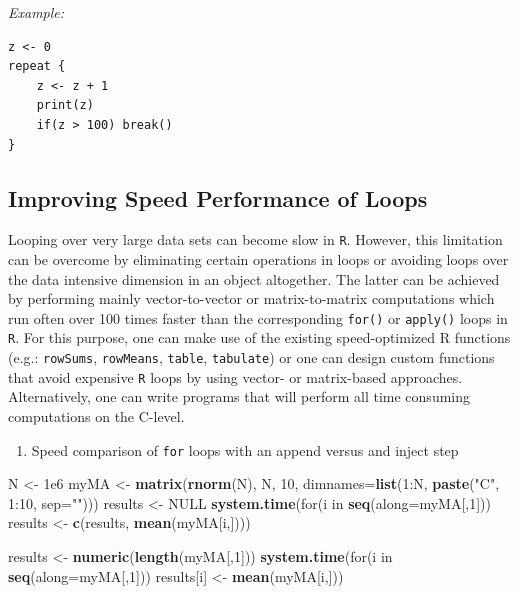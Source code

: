 \documentclass[]{article}
\def\tightlist{}
\newenvironment{Shaded}{\begin{snugshade}}{\end{snugshade}}
\newcommand{\KeywordTok}[1]{\textcolor[rgb]{0.13,0.29,0.53}{\textbf{{#1}}}}
\newcommand{\DataTypeTok}[1]{\textcolor[rgb]{0.13,0.29,0.53}{{#1}}}
\newcommand{\DecValTok}[1]{\textcolor[rgb]{0.00,0.00,0.81}{{#1}}}
\newcommand{\FloatTok}[1]{\textcolor[rgb]{0.00,0.00,0.81}{{#1}}}
\newcommand{\StringTok}[1]{\textcolor[rgb]{0.31,0.60,0.02}{{#1}}}
\newcommand{\OtherTok}[1]{\textcolor[rgb]{0.56,0.35,0.01}{{#1}}}
\newcommand{\NormalTok}[1]{{#1}}
\numberwithin{equation}{section}
\begin{document}
\emph{Example:}

\begin{verbatim}
z <- 0
repeat {
    z <- z + 1
    print(z)
    if(z > 100) break()
}
\end{verbatim}

\subsection{Improving Speed Performance of
Loops}\label{improving-speed-performance-of-loops}

Looping over very large data sets can become slow in \texttt{R}.
However, this limitation can be overcome by eliminating certain
operations in loops or avoiding loops over the data intensive dimension
in an object altogether. The latter can be achieved by performing mainly
vector-to-vector or matrix-to-matrix computations which run often over
100 times faster than the corresponding \texttt{for()} or
\texttt{apply()} loops in \texttt{R}. For this purpose, one can make use
of the existing speed-optimized R functions (e.g.: \texttt{rowSums},
\texttt{rowMeans}, \texttt{table}, \texttt{tabulate}) or one can design
custom functions that avoid expensive \texttt{R} loops by using vector-
or matrix-based approaches. Alternatively, one can write programs that
will perform all time consuming computations on the C-level.

\begin{enumerate}
\def\labelenumi{\arabic{enumi}.}
\tightlist
\item
  Speed comparison of \texttt{for} loops with an append versus and
  inject step
\end{enumerate}

\begin{Shaded}
\begin{Highlighting}[]
\NormalTok{N <-}\StringTok{ }\FloatTok{1e6}
\NormalTok{myMA <-}\StringTok{ }\KeywordTok{matrix}\NormalTok{(}\KeywordTok{rnorm}\NormalTok{(N), N, }\DecValTok{10}\NormalTok{, }\DataTypeTok{dimnames=}\KeywordTok{list}\NormalTok{(}\DecValTok{1}\NormalTok{:N, }\KeywordTok{paste}\NormalTok{(}\StringTok{"C"}\NormalTok{, }\DecValTok{1}\NormalTok{:}\DecValTok{10}\NormalTok{, }\DataTypeTok{sep=}\StringTok{""}\NormalTok{)))}
\NormalTok{results <-}\StringTok{ }\OtherTok{NULL}
\KeywordTok{system.time}\NormalTok{(for(i in }\KeywordTok{seq}\NormalTok{(}\DataTypeTok{along=}\NormalTok{myMA[,}\DecValTok{1}\NormalTok{])) }
            \NormalTok{results <-}\StringTok{ }\KeywordTok{c}\NormalTok{(results, }\KeywordTok{mean}\NormalTok{(myMA[i,])))}

\NormalTok{results <-}\StringTok{ }\KeywordTok{numeric}\NormalTok{(}\KeywordTok{length}\NormalTok{(myMA[,}\DecValTok{1}\NormalTok{]))}
\KeywordTok{system.time}\NormalTok{(for(i in }\KeywordTok{seq}\NormalTok{(}\DataTypeTok{along=}\NormalTok{myMA[,}\DecValTok{1}\NormalTok{])) }
            \NormalTok{results[i] <-}\StringTok{ }\KeywordTok{mean}\NormalTok{(myMA[i,]))}
\end{Highlighting}
\end{Shaded}
\end{document}
